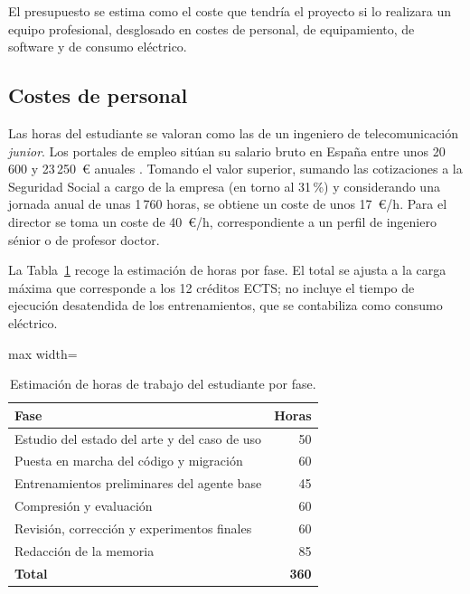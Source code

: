 El presupuesto se estima como el coste que tendría el proyecto si lo realizara un equipo profesional, desglosado en costes de personal, de equipamiento, de software y de consumo eléctrico.

\subsection{Costes de personal}\label{sec:costes_personal}

Las horas del estudiante se valoran como las de un ingeniero de telecomunicación \textit{junior}. Los portales de empleo sitúan su salario bruto en España entre unos 20\,600 y 23\,250~€ anuales \cite{jobted_teleco,glassdoor_teleco_junior}. Tomando el valor superior, sumando las cotizaciones a la Seguridad Social a cargo de la empresa (en torno al 31\,\%) y considerando una jornada anual de unas 1\,760 horas, se obtiene un coste de unos 17~€/h. Para el director se toma un coste de 40~€/h, correspondiente a un perfil de ingeniero sénior o de profesor doctor.

La Tabla~\ref{tab:horas} recoge la estimación de horas por fase. El total se ajusta a la carga máxima que corresponde a los 12 créditos ECTS; no incluye el tiempo de ejecución desatendida de los entrenamientos, que se contabiliza como consumo eléctrico.

\begin{table}[H]
	\centering
	\small
	\begin{adjustbox}{max width=\textwidth}
	\begin{tabular}{lr}
		\toprule
		\textbf{Fase} & \textbf{Horas} \\
		\midrule
		Estudio del estado del arte y del caso de uso & 50 \\
		Puesta en marcha del código y migración & 60 \\
		Entrenamientos preliminares del agente base & 45 \\
		Compresión y evaluación & 60 \\
		Revisión, corrección y experimentos finales & 60 \\
		Redacción de la memoria & 85 \\
		\midrule
		\textbf{Total} & \textbf{360} \\
		\bottomrule
	\end{tabular}
	\end{adjustbox}
	\caption{Estimación de horas de trabajo del estudiante por fase.}
	\label{tab:horas}
\end{table}


